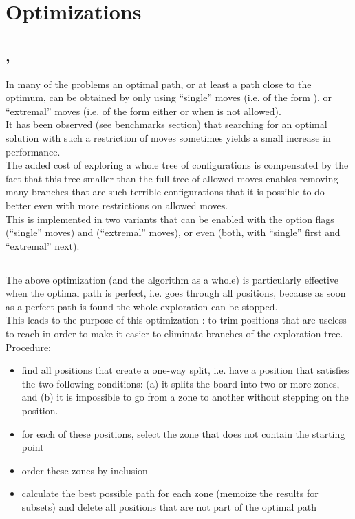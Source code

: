 \section{Optimizations}


\subsection{, }

In many of the problems an optimal path, or at least a path close to the optimum,
can be obtained by only using ``single'' moves (i.e. of the form ),
or ``extremal'' moves (i.e. of the form either  or  when
 is not allowed).\\

It has been observed (see benchmarks section) that searching for an optimal
solution with such a restriction of moves sometimes yields a small increase
in performance.\\
The added cost of exploring a whole tree of configurations is compensated
by the fact that this tree smaller than the full tree of allowed moves
enables removing many branches that are such terrible configurations
that it is possible to do better even with more restrictions on allowed moves.\\

This is implemented in two variants that can be enabled with the option flags
 (``single'' moves) and  (``extremal'' moves), or even
 (both, with ``single'' first and ``extremal'' next).\\


\subsection{}

The above optimization (and the algorithm as a whole) is particularly effective
when the optimal path is perfect, i.e. goes through all positions, because
as soon as a perfect path is found the whole exploration can be stopped.\\
This leads to the purpose of this optimization : to trim positions that
are useless to reach in order to make it easier to eliminate branches of the
exploration tree.\\

Procedure:
\begin{itemize}
    \item find all positions that create a one-way split, i.e. have a position
    that satisfies the two following conditions: (a) it splits the board into
    two or more zones, and (b) it is impossible to go from a zone to another
    without stepping on the position.
    \item for each of these positions, select the zone that does not
    contain the starting point
    \item order these zones by inclusion
    \item calculate the best possible path for each zone (memoize the results
    for subsets) and delete all positions that are not part of the optimal path
\end{itemize}~\\

